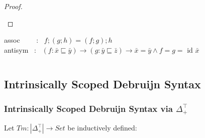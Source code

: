 \documentclass[aspectratio=169]{beamer}
\theoremstyle{remarkstyle}
\begin{document}
\begin{frame}[fragile]
\begin{columns}
\begin{column}{0.6\textwidth}
\begin{proof}
\begin{small}
        \end{small}
      \end{proof}
      \begin{corollary}
        \begin{small}
        assoc \ \ \ \ : \ $f;(g;h) = (f;g);h$\\
        antisym \ : \ $(f : \bar{x} ⊑ \bar{y}) → (g : \bar{y} ⊑ \bar{z}) → \bar{x} = \bar{y} \land f = g = $ id $\bar{x}$
        \end{small}
      \end{corollary}  
    \end{column}
  \end{columns}
\end{frame}


\subsection{Intrinsically Scoped Debruijn Syntax}

\begin{frame}[fragile]
  \frametitle{Intrinsically Scoped Debruijn Syntax via $Δ_+^⊤$}
  \begin{definition}
    Let $Tm : |Δ_+^⊤| → Set$ be inductively defined: \\
    \begin{columns}
      \begin{column}{0.3\textwidth}
        \begin{center}
        \end{center}
      \end{column}
      \begin{column}{0.3\textwidth}
        \begin{center}
        \end{center}
      \end{column}
      \begin{column}{0.3\textwidth}
        \begin{center}
        \end{center}
      \end{column}
    \end{columns}
  \end{definition}
  \begin{example}
    
  \end{example}
\end{frame}
\end{document}
